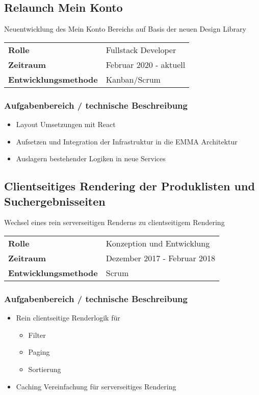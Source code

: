 \documentclass[10pt,ngerman,a4paper]{article}
\begin{document}
\subsection{Relaunch Mein Konto}
Neuentwicklung des Mein Konto Bereichs auf Basis der neuen Design Library

\begin{tabular}{ll}
\textbf{Rolle} & Fullstack Developer \\
\textbf{Zeitraum} & Februar 2020 - aktuell\\
\textbf{Entwicklungsmethode} & Kanban/Scrum
\end{tabular}

\subsubsection{Aufgabenbereich / technische Beschreibung}
\begin{itemize}
\item Layout Umsetzungen mit React
\item Aufsetzen und Integration der Infrastruktur in die EMMA Architektur
\item Auslagern bestehender Logiken in neue Services
\end{itemize}

\subsection{Clientseitiges Rendering der Produklisten und Suchergebnisseiten}
Wechsel eines rein serverseitigen Renderns zu clientseitigem Rendering

\begin{tabular}{ll}
\textbf{Rolle} & Konzeption und Entwicklung \\
\textbf{Zeitraum} & Dezember 2017 - Februar 2018\\
\textbf{Entwicklungsmethode} & Scrum
\end{tabular}

\subsubsection{Aufgabenbereich / technische Beschreibung}
\begin{itemize}
\item Rein clientseitige Renderlogik für
\begin{itemize}
\item Filter
\item Paging
\item Sortierung
\end{itemize}
\item Caching Vereinfachung für serverseitiges Rendering
\end{itemize}
\end{document}

